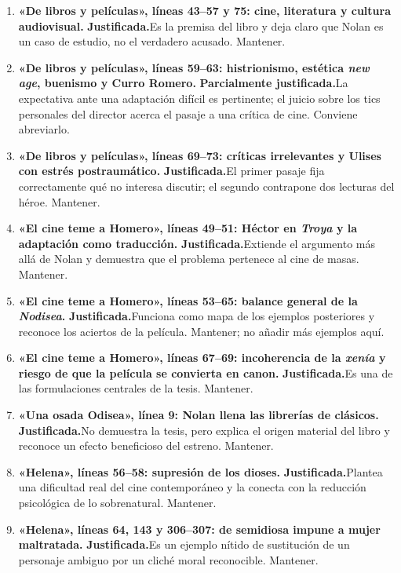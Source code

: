 \documentclass[11pt,a4paper]{article}
\newcommand{\justificada}{\textbf{Justificada.}}
\newcommand{\parcial}{\textbf{Parcialmente justificada.}}
\begin{document}
\begin{enumerate}

\item \textbf{«De libros y películas», líneas 43--57 y 75: cine, literatura y cultura audiovisual.} \justificada Es la premisa del libro y deja claro que Nolan es un caso de estudio, no el verdadero acusado. Mantener.

\item \textbf{«De libros y películas», líneas 59--63: histrionismo, estética \emph{new age}, buenismo y Curro Romero.} \parcial La expectativa ante una adaptación difícil es pertinente; el juicio sobre los tics personales del director acerca el pasaje a una crítica de cine. Conviene abreviarlo.

\item \textbf{«De libros y películas», líneas 69--73: críticas irrelevantes y Ulises con estrés postraumático.} \justificada El primer pasaje fija correctamente qué no interesa discutir; el segundo contrapone dos lecturas del héroe. Mantener.

\item \textbf{«El cine teme a Homero», líneas 49--51: Héctor en \emph{Troya} y la adaptación como traducción.} \justificada Extiende el argumento más allá de Nolan y demuestra que el problema pertenece al cine de masas. Mantener.

\item \textbf{«El cine teme a Homero», líneas 53--65: balance general de la \emph{Nodisea}.} \justificada Funciona como mapa de los ejemplos posteriores y reconoce los aciertos de la película. Mantener; no añadir más ejemplos aquí.

\item \textbf{«El cine teme a Homero», líneas 67--69: incoherencia de la \emph{xenía} y riesgo de que la película se convierta en canon.} \justificada Es una de las formulaciones centrales de la tesis. Mantener.

\item \textbf{«Una osada Odisea», línea 9: Nolan llena las librerías de clásicos.} \justificada No demuestra la tesis, pero explica el origen material del libro y reconoce un efecto beneficioso del estreno. Mantener.

\item \textbf{«Helena», líneas 56--58: supresión de los dioses.} \justificada Plantea una dificultad real del cine contemporáneo y la conecta con la reducción psicológica de lo sobrenatural. Mantener.

\item \textbf{«Helena», líneas 64, 143 y 306--307: de semidiosa impune a mujer maltratada.} \justificada Es un ejemplo nítido de sustitución de un personaje ambiguo por un cliché moral reconocible. Mantener.


\end{enumerate}
\end{document}
